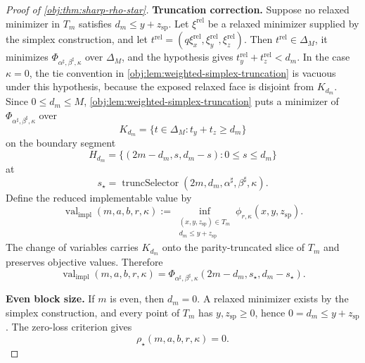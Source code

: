 \documentclass[11pt]{article}
\begin{document}
\begin{proof}[Proof of \cref{obj:thm:sharp-rho-star}]
\textbf{Truncation correction.}
Suppose no relaxed minimizer in \(T_m\) satisfies \(d_m\le y+z_{\mathrm{sp}}\).  Let \(\xi^{\mathrm{rel}}\) be a relaxed minimizer supplied by the simplex construction, and let \(t^{\mathrm{rel}}=(q\xi^{\mathrm{rel}}_x,\xi^{\mathrm{rel}}_y,\xi^{\mathrm{rel}}_z)\).  Then \(t^{\mathrm{rel}}\in\Delta_M\), it minimizes \(\Phi_{\alpha^\sharp,\beta^\sharp,\kappa}\) over \(\Delta_M\), and the hypothesis gives \(t^{\mathrm{rel}}_y+t^{\mathrm{rel}}_z<d_m\).  In the case \(\kappa=0\), the tie convention in \cref{obj:lem:weighted-simplex-truncation} is vacuous under this hypothesis, because the exposed relaxed face is disjoint from \(K_{d_m}\).  Since \(0\le d_m\le M\), \cref{obj:lem:weighted-simplex-truncation} puts a minimizer of \(\Phi_{\alpha^\sharp,\beta^\sharp,\kappa}\) over
\[
K_{d_m}=\{t\in\Delta_M:t_y+t_z\ge d_m\}
\]
on the boundary segment
\[
H_{d_m}=\{(2m-d_m,s,d_m-s):0\le s\le d_m\}
\]
at
\[
s_\star=\operatorname{truncSelector}(2m,d_m,\alpha^\sharp,\beta^\sharp,\kappa).
\]
Define the reduced implementable value by
\[
\operatorname{val}_{\mathrm{impl}}(m,a,b,r,\kappa)
:=
\inf_{\substack{(x,y,z_{\mathrm{sp}})\in T_m\\ d_m\le y+z_{\mathrm{sp}}}}
\phi_{r,\kappa}(x,y,z_{\mathrm{sp}}).
\]
The change of variables carries \(K_{d_m}\) onto the parity-truncated slice of \(T_m\) and preserves objective values.  Therefore
\[
\operatorname{val}_{\mathrm{impl}}(m,a,b,r,\kappa)
=
\Phi_{\alpha^\sharp,\beta^\sharp,\kappa}
(2m-d_m,s_\star,d_m-s_\star).
\]

\textbf{Even block size.}
If \(m\) is even, then \(d_m=0\).  A relaxed minimizer exists by the simplex construction, and every point of \(T_m\) has \(y,z_{\mathrm{sp}}\ge0\), hence \(0=d_m\le y+z_{\mathrm{sp}}\).  The zero-loss criterion gives
\[
\rho_\star(m,a,b,r,\kappa)=0 .
\]
\end{proof}




\end{document}
